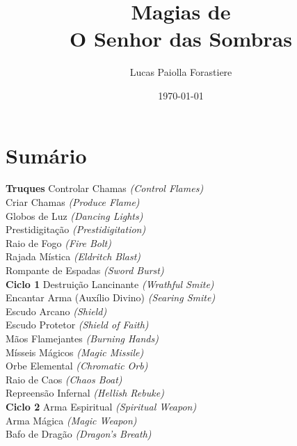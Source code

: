 \documentclass{RPG_Adventure}[2021/10/20]
\title{Magias de\\ \Huge{O Senhor das Sombras}}
\date{\today}
\author{Lucas Paiolla Forastiere}
\begin{document}
\maketitle

\chapter{Sumário}\n\n\noindent\textbf{Truques}
{\normalsize Controlar Chamas \textit{(Control Flames)}\\ }
{\normalsize Criar Chamas \textit{(Produce Flame)}\\ }
{\normalsize Globos de Luz \textit{(Dancing Lights)}\\ }
{\normalsize Prestidigitação \textit{(Prestidigitation)}\\ }
{\normalsize Raio de Fogo \textit{(Fire Bolt)}\\ }
{\normalsize Rajada Mística \textit{(Eldritch Blast)}\\ }
{\normalsize Rompante de Espadas \textit{(Sword Burst)}\\ }
\jump\noindent\textbf{Ciclo 1}
{\normalsize Destruição Lancinante \textit{(Wrathful Smite)}\\ }
{\normalsize Encantar Arma (Auxílio Divino) \textit{(Searing Smite)}\\ }
{\normalsize Escudo Arcano \textit{(Shield)}\\ }
{\normalsize Escudo Protetor \textit{(Shield of Faith)}\\ }
{\normalsize Mãos Flamejantes \textit{(Burning Hands)}\\ }
{\normalsize Mísseis Mágicos \textit{(Magic Missile)}\\ }
{\normalsize Orbe Elemental \textit{(Chromatic Orb)}\\ }
{\normalsize Raio de Caos \textit{(Chaos Boat)}\\ }
{\normalsize Repreensão Infernal \textit{(Hellish Rebuke)}\\ }
\jump\noindent\textbf{Ciclo 2}
{\normalsize Arma Espiritual \textit{(Spiritual Weapon)}\\ }
{\normalsize Arma Mágica \textit{(Magic Weapon)}\\ }
{\normalsize Bafo de Dragão \textit{(Dragon's Breath)}\\ }
\end{document}
